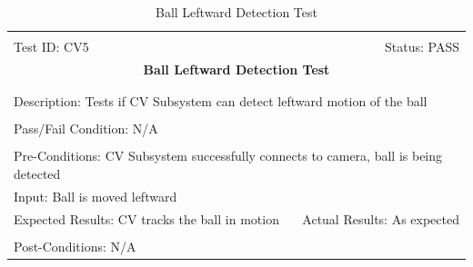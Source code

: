 \documentclass[11pt]{article}
\begin{document}
\begin{center}
\begin{table}[H]
\begin{tabular}{|l r|}\hline&\\[-2mm]
	Test ID: CV5	&Status: PASS\\[-3mm]
	\multicolumn{2}{|c|}{\textbf{\large{Ball Leftward Detection Test}}}\\&\\\hline&\\[-3mm]
	\multicolumn{2}{|p{\textwidth}|}{Description: Tests if CV Subsystem can detect leftward motion of the ball}\\[1mm]\hline&\\[-3mm]
	\multicolumn{2}{|p{\textwidth}|}{Pass/Fail Condition: N/A }\\[1mm]\hline&\\[-3mm]
	\multicolumn{2}{|p{\textwidth}|}{Pre-Conditions: CV Subsystem successfully connects to camera, ball is being detected}\\[4mm]
	\multicolumn{2}{|p{\textwidth}|}{Input: Ball is moved leftward}\\[2mm]\hline
	\multicolumn{1}{|p{0.49\textwidth}}{Expected Results: CV tracks the ball in motion}	&\multicolumn{1}{|p{0.45\textwidth}|}{Actual Results: As expected}\\\hline&\\[-3mm]
	\multicolumn{2}{|p{\textwidth}|}{Post-Conditions: N/A}\\\hline
\end{tabular}
\caption{Ball Leftward Detection Test}
\end{table}
\end{center}
\end{document}
